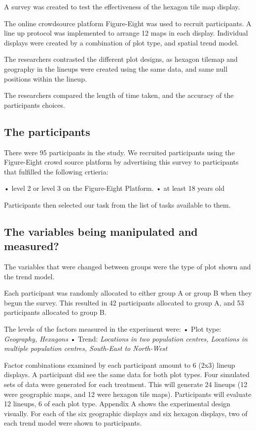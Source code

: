 \documentclass[conference,final,]{IEEEtran}
\begin{document}
A survey was created to test the effectiveness of the hexagon tile map
display.

The online crowdsource platform Figure-Eight was used to recruit
participants. A line up protocol was implemented to arrange 12 maps in
each display. Individual displays were created by a combination of plot
type, and spatial trend model.

The researchers contrasted the different plot designs, as hexagon
tilemap and geography in the lineups were created using the same data,
and same null positions within the lineup.

The researchers compared the length of time taken, and the accuracy of
the participants choices.

\hypertarget{the-participants}{%
\subsection{The participants}\label{the-participants}}

There were 95 participants in the study. We recruited participants using
the Figure-Eight crowd source platform by advertising this survey to
participants that fulfilled the following crtieria:

• level 2 or level 3 on the Figure-Eight Platform. • at least 18 years
old

Participants then selected our task from the list of tasks available to
them.

\hypertarget{the-variables-being-manipulated-and-measured}{%
\subsection{The variables being manipulated and
measured?}\label{the-variables-being-manipulated-and-measured}}

The variables that were changed between groups were the type of plot
shown and the trend model.

Each participant was randomly allocated to either group A or group B
when they begun the survey. This resulted in 42 participants allocated
to group A, and 53 participants allocated to group B.

The levels of the factors measured in the experiment were: • Plot type:
\emph{Geography, Hexagons} • Trend: \emph{Locations in two population
centres, Locations in multiple population centres, South-East to
North-West}

Factor combinations examined by each participant amount to 6 (2x3)
lineup displays. A participant did see the same data for both plot
types. Four simulated sets of data were generated for each treatment.
This will generate 24 lineups (12 were geographic maps, and 12 were
hexagon tile maps). Participants will evaluate 12 lineups, 6 of each
plot type. Appendix A shows the experimental design visually. For each
of the six geographic displays and six hexagon displays, two of each
trend model were shown to participants.
\end{document}
